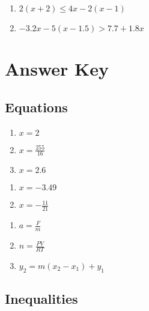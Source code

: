 \begin{multicols}{3}
\begin{enumerate}
	\item $2(x+2) \leq 4x - 2(x-1)$
	\item $-3.2x - 5(x - 1.5) > 7.7 + 1.8x$
\end{enumerate}
\end{multicols}

\newpage

\section{Answer Key}

\subsection*{Equations}

\begin{multicols}{3}
\begin{enumerate}
	\item $x = 2$
	\item $x = \frac{255}{16}$
	\item $x = 2.6$
\end{enumerate}	\setcounter{Review}{\value{enumi}}
\end{multicols}
\begin{multicols}{3}
\begin{enumerate}	\setcounter{enumi}{\value{Review}}
	\item $x = -3.49$
	\item $x = -\frac{11}{21}$
\end{enumerate}	\setcounter{Review}{\value{enumi}}
\end{multicols}

\begin{multicols}{3}
\begin{enumerate}	\setcounter{enumi}{\value{Review}}
	\item $a = \frac{F}{m}$
	\item $n = \frac{PV}{RT}$
	\item $y_2 = m(x_2-x_1)+y_1$
\end{enumerate}	\setcounter{Review}{\value{enumi}}
\end{multicols}



\subsection*{Inequalities}

